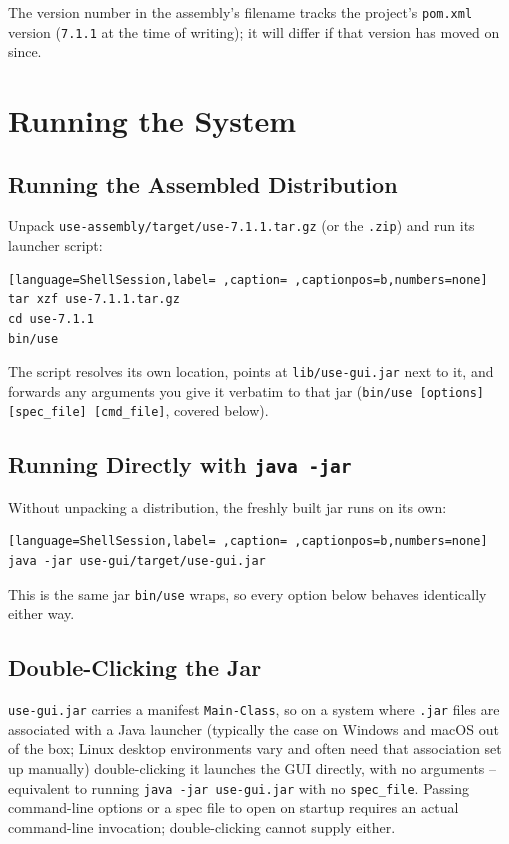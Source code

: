 \documentclass[11pt,twoside,a4paper]{book}
\begin{document}
The version number in the assembly's filename tracks the project's
\texttt{pom.xml} version (\texttt{7.1.1} at the time of writing); it will differ if
that version has moved on since.
\chapter{Running the System}
\label{sec:org6dc86d5}
\section{Running the Assembled Distribution}
\label{sec:org939475c}
Unpack \texttt{use-assembly/target/use-7.1.1.tar.gz} (or the \texttt{.zip}) and run
its launcher script:

\begin{lstlisting}[language=ShellSession,label= ,caption= ,captionpos=b,numbers=none]
tar xzf use-7.1.1.tar.gz
cd use-7.1.1
bin/use
\end{lstlisting}

The script resolves its own location, points at
\texttt{lib/use-gui.jar} next to it, and forwards any arguments you give it
verbatim to that jar (\texttt{bin/use [options] [spec\_file] [cmd\_file]},
covered below).

\section{Running Directly with \texttt{java -jar}}
\label{sec:org01d8df8}
Without unpacking a distribution, the freshly built jar runs on its
own:

\begin{lstlisting}[language=ShellSession,label= ,caption= ,captionpos=b,numbers=none]
java -jar use-gui/target/use-gui.jar
\end{lstlisting}

This is the same jar \texttt{bin/use} wraps, so every option below behaves
identically either way.

\section{Double-Clicking the Jar}
\label{sec:org8db5eee}
\texttt{use-gui.jar} carries a manifest \texttt{Main-Class}, so on a system where
\texttt{.jar} files are associated with a Java launcher (typically the case
on Windows and macOS out of the box; Linux desktop environments vary
and often need that association set up manually) double-clicking it
launches the GUI directly, with no arguments -- equivalent to running
\texttt{java -jar use-gui.jar} with no \texttt{spec\_file}. Passing command-line
options or a spec file to open on startup requires an actual
command-line invocation; double-clicking cannot supply either.
\end{document}
